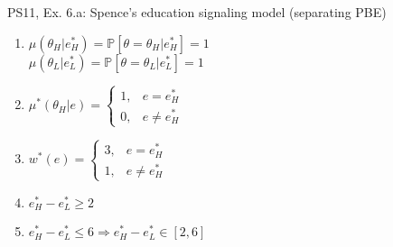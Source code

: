 \begin{frame}{PS11, Ex. 6.a: Spence’s education signaling model (separating PBE)}
\begin{multicols}{2}
\begin{enumerate}
        \item \vspace{-2pt}$\mu\left(\theta_H|e_H^*\right)=
               \mathbb{P}\left[\theta=\theta_H|e_H^*\right]=1$\\
              $\mu\left(\theta_L|e_L^*\right)=
               \mathbb{P}\left[\theta=\theta_L|e_L^*\right]=1$
        \item \vspace{-2pt}$\mu^*(\theta_H|e)=\left\{\begin{array}{ll}
                  1, & e = e_H^* \\
                  0, & e \neq e_H^*
               \end{array}\right.$
        \item \vspace{-2pt}$w^*(e)=\left\{\begin{array}{ll}
                  3, & e = e_H^* \\
                  1, & e \neq e_H^*
               \end{array}\right.$
        \item \vspace{-2pt}$e_H^*-e_L^*\geq2$
        \item \vspace{-2pt}$e_H^*-e_L^*\leq6\Rightarrow e_H^*-e_L^*\in[2,6]$
      \end{enumerate}
    \end{multicols}
    \vfill\null
\end{frame}
